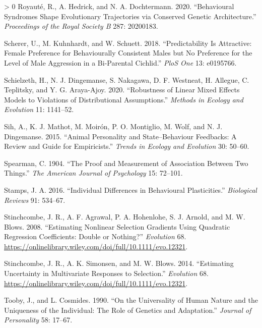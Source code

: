 \documentclass{article}
\newlength{\cslhangindent}
\newenvironment{CSLReferences}[3] %
 {%
  \setlength{\parindent}{0pt}
  \ifodd #1 \everypar{\setlength{\hangindent}{\cslhangindent}}\ignorespaces\fi
  \ifnum #2 > 0
  \setlength{\parskip}{#2\baselineskip}
  \fi
 }%
 {}
\begin{document}
\begin{CSLReferences}{1}{0}
\leavevmode\hypertarget{ref-Roy2020}{}%
Royauté, R., A. Hedrick, and N. A. Dochtermann. 2020. {``Behavioural
Syndromes Shape Evolutionary Trajectories via Conserved Genetic
Architecture.''} \emph{Proceedings of the Royal Society B} 287:
20200183.

\leavevmode\hypertarget{ref-Scherer2018}{}%
Scherer, U., M. Kuhnhardt, and W. Schuett. 2018. {``Predictability Is
Attractive: Female Preference for Behaviourally Consistent Males but No
Preference for the Level of Male Aggression in a Bi-Parental Cichlid.''}
\emph{PloS One} 13: e0195766.

\leavevmode\hypertarget{ref-Schiel2020}{}%
Schielzeth, H., N. J. Dingemanse, S. Nakagawa, D. F. Westneat, H.
Allegue, C. Teplitsky, and Y. G. Araya-Ajoy. 2020. {``Robustness of
Linear Mixed Effects Models to Violations of Distributional
Assumptions.''} \emph{Methods in Ecology and Evolution} 11: 1141--52.

\leavevmode\hypertarget{ref-Sih2015}{}%
Sih, A., K. J. Mathot, M. Moirón, P. O. Montiglio, M. Wolf, and N. J.
Dingemanse. 2015. {``Animal Personality and State--Behaviour Feedbacks:
A Review and Guide for Empiricists.''} \emph{Trends in Ecology and
Evolution} 30: 50--60.

\leavevmode\hypertarget{ref-Spearman1904}{}%
Spearman, C. 1904. {``The Proof and Measurement of Association Between
Two Things.''} \emph{The American Journal of Psychology} 15: 72--101.

\leavevmode\hypertarget{ref-Stamps2016}{}%
Stamps, J. A. 2016. {``Individual Differences in Behavioural
Plasticities.''} \emph{Biological Reviews} 91: 534--67.

\leavevmode\hypertarget{ref-Stinch2008}{}%
Stinchcombe, J. R., A. F. Agrawal, P. A. Hohenlohe, S. J. Arnold, and M.
W. Blows. 2008. {``Estimating Nonlinear Selection Gradients Using
Quadratic Regression Coefficients: Double or Nothing?''}
\emph{Evolution} 68.
\url{https://onlinelibrary.wiley.com/doi/full/10.1111/evo.12321}.

\leavevmode\hypertarget{ref-Stinch2014}{}%
Stinchcombe, J. R., A. K. Simonsen, and M. W. Blows. 2014. {``Estimating
Uncertainty in Multivariate Responses to Selection.''} \emph{Evolution}
68. \url{https://onlinelibrary.wiley.com/doi/full/10.1111/evo.12321}.

\leavevmode\hypertarget{ref-Tooby1990}{}%
Tooby, J., and L. Cosmides. 1990. {``On the Universality of Human Nature
and the Uniqueness of the Individual: The Role of Genetics and
Adaptation.''} \emph{Journal of Personality} 58: 17--67.


\end{CSLReferences}
\end{document}
